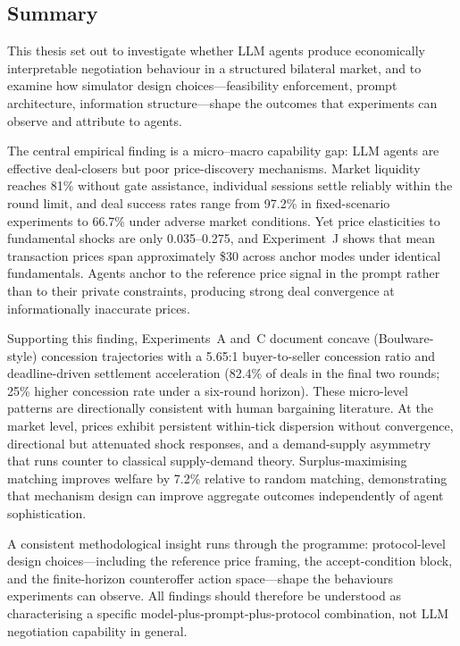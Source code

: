 
\label{sec:conclusion}

\subsection{Summary}

This thesis set out to investigate whether LLM agents produce economically interpretable negotiation behaviour in a structured bilateral market, and to examine how simulator design choices---feasibility enforcement, prompt architecture, information structure---shape the outcomes that experiments can observe and attribute to agents.

The central empirical finding is a micro--macro capability gap: LLM agents are effective deal-closers but poor price-discovery mechanisms.  Market liquidity reaches 81\% without gate assistance, individual sessions settle reliably within the round limit, and deal success rates range from 97.2\% in fixed-scenario experiments to 66.7\% under adverse market conditions.  Yet price elasticities to fundamental shocks are only 0.035--0.275, and Experiment~J shows that mean transaction prices span approximately \$30 across anchor modes under identical fundamentals.  Agents anchor to the reference price signal in the prompt rather than to their private constraints, producing strong deal convergence at informationally inaccurate prices.

Supporting this finding, Experiments~A and~C document concave (Boulware-style) concession trajectories with a 5.65:1 buyer-to-seller concession ratio and deadline-driven settlement acceleration (82.4\% of deals in the final two rounds; 25\% higher concession rate under a six-round horizon).  These micro-level patterns are directionally consistent with human bargaining literature.  At the market level, prices exhibit persistent within-tick dispersion without convergence, directional but attenuated shock responses, and a demand-supply asymmetry that runs counter to classical supply-demand theory.  Surplus-maximising matching improves welfare by 7.2\% relative to random matching, demonstrating that mechanism design can improve aggregate outcomes independently of agent sophistication.

A consistent methodological insight runs through the programme: protocol-level design choices---including the reference price framing, the accept-condition block, and the finite-horizon counteroffer action space---shape the behaviours experiments can observe.  All findings should therefore be understood as characterising a specific model-plus-prompt-plus-protocol combination, not LLM negotiation capability in general.

